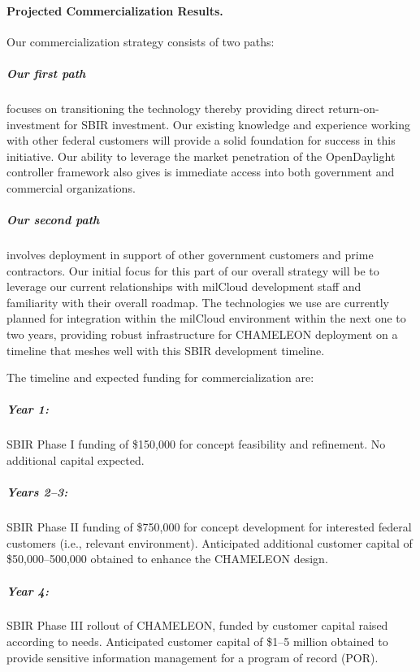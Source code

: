\documentclass{sbir}
\begin{document}
\paragraph{Projected Commercialization Results.} Our commercialization strategy consists of two paths:

\vspace{-18pt}
\subparagraph{Our first path} focuses on transitioning the technology thereby providing direct return-on-investment for SBIR investment. Our existing knowledge and experience working with other federal customers will provide a solid foundation for success in this initiative. Our ability to leverage the market penetration of the OpenDaylight controller framework also gives is immediate access into both government and commercial organizations.

\vspace{-18pt}
\subparagraph{Our second path} involves deployment in support of other government customers and prime contractors.  Our initial focus for this part of our overall strategy will be to leverage our current relationships with milCloud development staff and familiarity with their overall roadmap. The technologies we use are currently planned for integration within the milCloud environment within the next one to two years, providing robust infrastructure for CHAMELEON deployment on a timeline that meshes well with this SBIR development timeline.

The timeline and expected funding for commercialization are:
\vspace{-18pt}
\subparagraph{Year 1:} SBIR Phase I funding of \$150,000 for concept feasibility and refinement. No additional capital expected.
\vspace{-18pt}
\subparagraph{Years 2--3:} SBIR Phase II funding of \$750,000 for concept development for interested federal customers (i.e., relevant environment). Anticipated additional customer capital of \$50,000--500,000 obtained to enhance the CHAMELEON design.
\vspace{-18pt}
\subparagraph{Year 4:} SBIR Phase III rollout of CHAMELEON, funded by customer capital raised according to needs. Anticipated customer capital of \$1--5 million obtained to provide sensitive information management for a program of record (POR).
\end{document}
